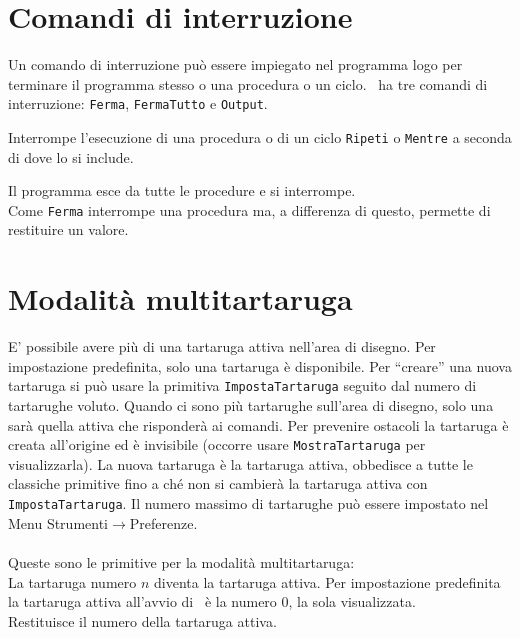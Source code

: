 \section{Comandi di interruzione}
Un comando di interruzione può essere impiegato nel programma logo per terminare il programma stesso o una procedura o un ciclo. \xlogo\ ha tre comandi di interruzione: \texttt{Ferma}, \texttt{FermaTutto} e \texttt{Output}.\\
\label{break}

Interrompe l'esecuzione di una procedura o di un ciclo \texttt{Ripeti} o \texttt{Mentre} a seconda di dove lo si include.

Il programma esce da tutte le procedure e si interrompe.\\

Come \texttt{Ferma} interrompe una procedura ma, a differenza di questo, permette di restituire un valore.



\section{Modalità multitartaruga}
E' possibile avere più di una tartaruga attiva nell'area di disegno. Per impostazione predefinita, solo una tartaruga è disponibile. Per ``creare'' una nuova tartaruga si può usare la primitiva \texttt{ImpostaTartaruga} seguito dal numero di tartarughe voluto. Quando ci sono più tartarughe sull'area di disegno, solo una sarà quella attiva che risponderà ai comandi. Per prevenire ostacoli la tartaruga è creata all'origine ed è invisibile (occorre usare \texttt{MostraTartaruga} per visualizzarla). La nuova tartaruga è la tartaruga attiva, obbedisce a tutte le classiche primitive fino a ché non si cambierà la tartaruga attiva con \texttt{ImpostaTartaruga}. Il numero massimo di tartarughe può essere impostato nel Menu Strumenti$\to$Preferenze.\\
\\
Queste sono le primitive per la modalità multitartaruga:\\

La tartaruga numero $n$ diventa la tartaruga attiva. Per impostazione predefinita la tartaruga attiva all'avvio di \xlogo\ è la numero 0, la sola visualizzata.\\

Restituisce il numero della tartaruga attiva. \\

